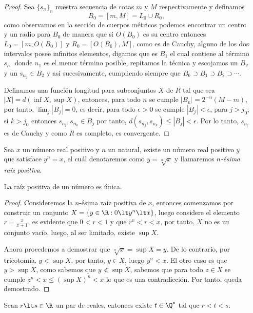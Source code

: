 \documentclass[11pt,oneside,a4paper]{book}
\begin{document}
\begin{proof}
Sea $\{s_n\}_n$ nuestra secuencia de cotas $m$ y $M$ respectivamente y definamos
$$B_0=[m,M]=L_0\cup R_0,$$
como observamos en la sección de cuerpos métricos podemos encontrar un centro y un radio para $B_0$ de manera que si $O(B_0)$ es su centro entonces $L_0=[m,O(B_0)]$ y $R_0=[O(B_0),M]$, como es de Cauchy, alguno de los dos intervalos posee infinitos elementos, digamos que es $B_1$ el cual contiene al término $s_{n_1}$ donde $n_1$ es el menor término posible, repitamos la técnica y escojamos un $B_2$ y un $s_{n_2}\in B_2$ y así sucesivamente, cumpliendo siempre que $B_0\supset B_1\supset B_2\supset\cdots$.

Definamos una función longitud para subconjuntos $X$ de $R$ tal que sea $|X|=d(\inf X,\sup X)$, entonces, para todo $n$ se cumple $|B_n|=2^{-n}(M-m)$, por tanto, $\lim_j |B_j|=0$, es decir, para todo $\epsilon\gt 0$ se cumple $|B_j|\lt\epsilon$, para $j\gt j_0$; si $k\gt j_0$ entonces $s_{n_j},s_{n_k}\in B_j$ por tanto, $d(s_{n_j},s_{n_k})\leq|B_j|\lt\epsilon$. Por lo tanto, $s_{n_j}$ es de Cauchy y como $R$ es completo, es convergente.
\end{proof}
\begin{mydef}
Sea $x$ un número real positivo y $n$ un natural, existe un número real positivo $y$ que satisface $y^n=x$, el cuál denotaremos como $y=\sqrt[n]{x}$ y llamaremos \textit{$n$-ésima raíz positiva}.
\end{mydef}
\begin{thm}
La raíz positiva de un número es única.
\end{thm}
\begin{proof}
Consideremos la $n$-ésima raíz positiva de $x$, entonces comenzamos por construir un conjunto $X=\{y\in\R:0\lt y^n\lt x\}$, luego considere el elemento $r=\frac{x}{x+1}$, es evidente que $0\lt r\lt 1$ y que $r^n\lt r\lt x$, por tanto, $X$ no es un conjunto vacío, luego, al ser limitado, existe $\sup X$.

Ahora procedemos a demostrar que $\sqrt[n]{x}=\sup X=y$. De lo contrario, por tricotomía, $y\lt\sup X$, por tanto, $y\in X$, luego $y^n\lt x$. El otro caso es que $y\gt\sup X$, como sabemos que $y\not\lt\sup X$, sabemos que para todo $z\in X$ se cumple $z^n\lt x\leq(\sup X)^n\lt x$ lo que es una contradicción. Por tanto, queda demostrado.
\end{proof}
\begin{thm}[Densidad de $\Q^*$ en $\R$]
Sean $r\lt s\in\R$ un par de reales, entonces existe $t\in\Q^*$ tal que $r\lt t\lt s$.
\end{thm}
\end{document}
